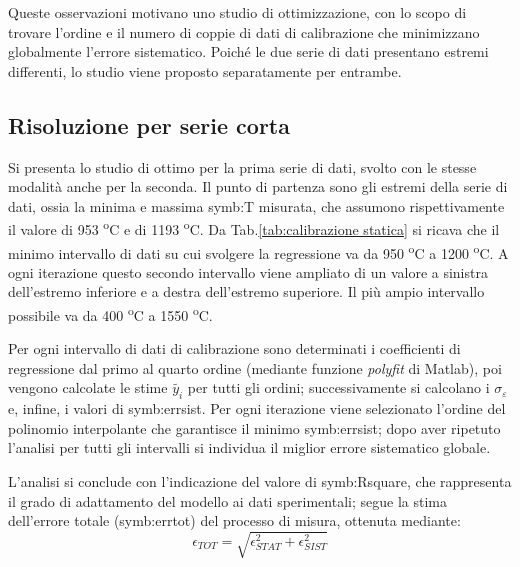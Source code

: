 Queste osservazioni motivano uno studio di ottimizzazione, con lo scopo di trovare l'ordine e il numero di coppie di dati di calibrazione che minimizzano globalmente l'errore sistematico. 
Poiché le due serie di dati presentano estremi differenti, lo studio viene proposto separatamente per entrambe.


\subsection{Risoluzione per serie corta}
Si presenta lo studio di ottimo per la prima serie di dati, svolto con le stesse modalità anche per la seconda. Il punto di partenza sono gli estremi della serie di dati, ossia la minima e massima \gls{symb:T} misurata, che assumono rispettivamente il valore di 953 \textsuperscript{o}C e di 1193 \textsuperscript{o}C. Da Tab.\ref{tab:calibrazione statica} si ricava che il minimo intervallo di dati su cui svolgere la regressione va da 950 \textsuperscript{o}C a 1200 \textsuperscript{o}C. A ogni iterazione questo secondo intervallo viene ampliato di un valore a sinistra dell'estremo inferiore e a destra dell'estremo superiore. Il più ampio intervallo possibile va da 400 \textsuperscript{o}C a 1550 \textsuperscript{o}C. 

Per ogni intervallo di dati di calibrazione sono determinati i coefficienti di regressione dal primo al quarto ordine (mediante funzione \textit{polyfit} di Matlab), poi vengono calcolate le stime $\tilde{y_i}$ per tutti gli ordini; successivamente si calcolano i $\sigma_{\varepsilon}$ e, infine, i valori di \gls{symb:errsist}. Per ogni iterazione viene selezionato l'ordine del polinomio interpolante che garantisce il minimo \gls{symb:errsist}; dopo aver ripetuto l'analisi per tutti gli intervalli si individua il miglior errore sistematico globale. 

L'analisi si conclude con l'indicazione del valore di \gls{symb:Rsquare}, che rappresenta il grado di adattamento del modello ai dati sperimentali; segue la stima dell'errore totale (\gls{symb:errtot}) del processo di misura, ottenuta mediante: 
\begin{equation}
	\epsilon_{\textit{TOT}}=\sqrt{\epsilon_{\textit{STAT}}^2+\epsilon_{\textit{SIST}}^2}
\end{equation}

